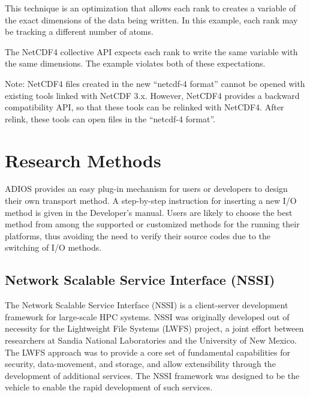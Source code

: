 This technique is an optimization that allows each rank to creates a variable of 
the exact dimensions of the data being written.  In this example, each rank may 
be tracking a different number of atoms.

The NetCDF4 collective API expects each rank to write the same variable with the 
same dimensions.  The example violates both of these expectations.

Note: NetCDF4 files created in the new ``netcdf-4 format'' cannot be opened with 
existing tools linked with NetCDF 3.x.  However, NetCDF4 provides a backward compatibility 
API, so that these tools can be relinked with NetCDF4.  After relink, these tools 
can open files in the ``netcdf-4 format''.


\section{Research Methods}

ADIOS provides an easy plug-in mechanism for users or developers to design their 
own transport method. A step-by-step instruction for inserting a new I/O method 
is given in the Developer's manual. Users are likely to choose the best method from among 
the supported or customized methods for the running their platforms, thus avoiding 
the need to verify their source codes due to the switching of I/O methods.


\subsection{Network Scalable Service Interface (NSSI)}

The Network Scalable Service Interface (NSSI) is a client-server development framework 
for large-scale HPC systems.  NSSI was originally developed out of necessity for 
the Lightweight File Systems (LWFS) project, a joint effort between researchers 
at Sandia National Laboratories and the University of New Mexico.  The LWFS approach 
was to provide a core set of fundamental capabilities for security, data-movement, 
and storage, and allow extensibility through the development of additional services. 
 The NSSI framework was designed to be the vehicle to enable the rapid development 
of such services.

